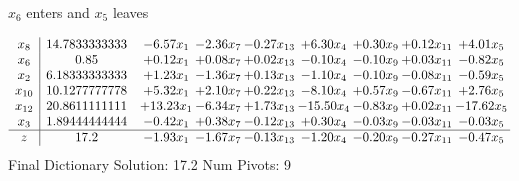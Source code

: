 \documentclass[9pt]{article}
\begin{document}
 $ x_{6} $ enters and $ x_{5} $ leaves 

 \[\begin{array}{c| c c@{\hskip 2pt} c@{\hskip 2pt} c@{\hskip 2pt} c@{\hskip 2pt} c@{\hskip 2pt} c@{\hskip 2pt} c@{\hskip 2pt} }
 x_{8}   &  14.7833333333 & -6.57 x_{1} & -2.36 x_{7} & -0.27 x_{13} & +  6.30 x_{4} & +  0.30 x_{9} & +  0.12 x_{11} & +  4.01 x_{5}\\
 x_{6}   &  0.85 & +  0.12 x_{1} & +  0.08 x_{7} & +  0.02 x_{13} & -0.10 x_{4} & -0.10 x_{9} & +  0.03 x_{11} & -0.82 x_{5}\\
 x_{2}   &  6.18333333333 & +  1.23 x_{1} & -1.36 x_{7} & +  0.13 x_{13} & -1.10 x_{4} & -0.10 x_{9} & -0.08 x_{11} & -0.59 x_{5}\\
 x_{10}   &  10.1277777778 & +  5.32 x_{1} & +  2.10 x_{7} & +  0.22 x_{13} & -8.10 x_{4} & +  0.57 x_{9} & -0.67 x_{11} & +  2.76 x_{5}\\
 x_{12}   &  20.8611111111 & + 13.23 x_{1} & -6.34 x_{7} & +  1.73 x_{13} & -15.50 x_{4} & -0.83 x_{9} & +  0.02 x_{11} & -17.62 x_{5}\\
 x_{3}   &  1.89444444444 & -0.42 x_{1} & +  0.38 x_{7} & -0.12 x_{13} & +  0.30 x_{4} & -0.03 x_{9} & -0.03 x_{11} & -0.03 x_{5}\\
\hline
z    &  17.2 & -1.93 x_{1} & -1.67 x_{7} & -0.13 x_{13} & -1.20 x_{4} & -0.20 x_{9} & -0.27 x_{11} & -0.47 x_{5}\\
\end{array}\]
Final Dictionary
Solution:  17.2
Num Pivots:  9
\end{document}
